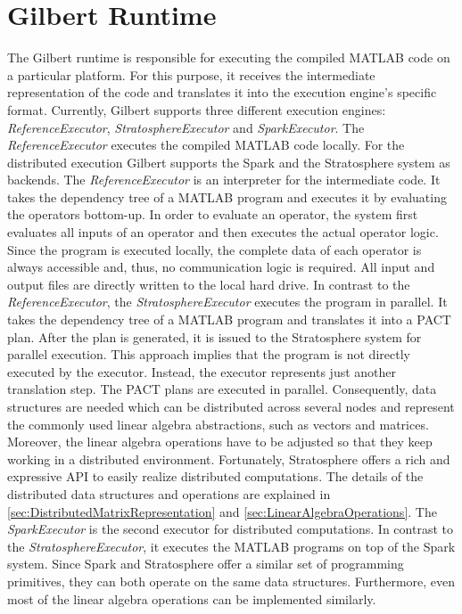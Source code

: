 \section{Gilbert Runtime}
\label{sec:gilbertRuntime}

The Gilbert runtime is responsible for executing the compiled MATLAB code on a particular platform. For this purpose, it receives the intermediate representation of the code and translates it into the execution engine's specific format. Currently, Gilbert supports three different execution engines: \emph{ReferenceExecutor}, \emph{StratosphereExecutor} and \emph{SparkExecutor}. The \emph{ReferenceExecutor} executes the compiled MATLAB code locally. For the distributed execution Gilbert supports the Spark and the Stratosphere system as backends. The \emph{ReferenceExecutor} is an interpreter for the intermediate code.
It takes the dependency tree of a MATLAB program and executes it by evaluating the operators bottom-up. In order to evaluate an operator, the system first evaluates all inputs of an operator and then executes the actual operator logic. Since the program is executed locally, the complete data of each operator is always accessible and, thus, no communication logic is required. All input and output files are directly written to the local hard drive. In contrast to the \emph{ReferenceExecutor}, the \emph{StratosphereExecutor} executes the program in parallel. It takes the dependency tree of a MATLAB program and translates it into a PACT plan. After the plan is generated, it is issued to the Stratosphere system for parallel execution. This approach implies that the program is not directly executed by the executor. Instead, the executor represents just another translation step. The PACT plans are executed in parallel. Consequently, data structures are needed which can be distributed across several nodes and represent the commonly used linear algebra abstractions, such as vectors and matrices. Moreover, the linear algebra operations have to be adjusted so that they keep working in a distributed environment. Fortunately, Stratosphere offers a rich and expressive API to easily realize distributed computations. The details of the distributed data structures and operations are explained in \cref{sec:DistributedMatrixRepresentation} and \cref{sec:LinearAlgebraOperations}. The \emph{SparkExecutor} is the second executor for distributed computations. In contrast to the \emph{StratosphereExecutor}, it executes the MATLAB programs on top of the Spark system. Since Spark and Stratosphere offer a similar set of programming primitives, they can both operate on the same data structures. Furthermore, even most of the linear algebra operations can be implemented similarly.

